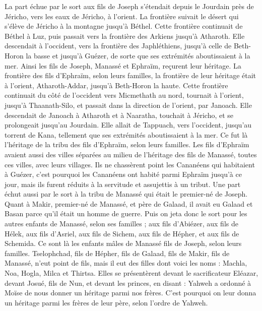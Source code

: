 \begin{multicols}{2}
\VerseOne{}La part échue par le sort aux fils de Joseph s’étendait depuis le Jourdain près de Jéricho, vers les eaux de Jéricho, à l’orient. La frontière suivait le désert qui s’élève de Jéricho à la montagne jusqu’à Béthel.
Cette frontière continuait de Béthel à Luz, puis passait vers la frontière des Arkiens jusqu’à Atharoth.
Elle descendait à l’occident, vers la frontière des Japhléthiens, jusqu’à celle de Beth-Horon la basse et jusqu’à Guézer, de sorte que ses extrémités aboutissaient à la mer.
Ainsi les fils de Joseph, Manassé et Ephraïm, reçurent leur héritage.
La frontière des fils d’Ephraïm, selon leurs familles, la frontière de leur héritage était à l’orient, Atharoth-Addar, jusqu’à Beth-Horon la haute.
Cette frontière continuait du côté de l’occident vers Micmethath au nord, tournait à l’orient, jusqu’à Thaanath-Silo, et passait dans la direction de l’orient, par Janoach.
Elle descendait de Janoach à Atharoth et à Naaratha, touchait à Jéricho, et se prolongeait jusqu’au Jourdain.
Elle allait de Tappuach, vers l’occident, jusqu’au torrent de Kana, tellement que ses extrémités aboutissaient à la mer. Ce fut là l’héritage de la tribu des fils d’Ephraïm, selon leurs familles.
Les fils d’Ephraïm avaient aussi des villes séparées au milieu de l’héritage des fils de Manassé, toutes ces villes, avec leurs villages.
Ils ne chassèrent point les Cananéens qui habitaient à Guézer, c’est pourquoi les Cananéens ont habité parmi Ephraïm jusqu’à ce jour, mais ils furent réduits à la servitude et assujettis à un tribut.
\VerseOne{}Une part échut aussi par le sort à la tribu de Manassé qui était le premier-né de Joseph. Quant à Makir, premier-né de Manassé, et père de Galaad, il avait eu Galaad et Basan parce qu’il était un homme de guerre.
Puis on jeta donc le sort pour les autres enfants de Manassé, selon ses familles ; aux fils d’Abiézer, aux fils de Hélek, aux fils d’Asriel, aux fils de Sichem, aux fils de Hépher, et aux fils de Schemida. Ce sont là les enfants mâles de Manassé fils de Joseph, selon leurs familles.
Tselophchad, fils de Hépher, fils de Galaad, fils de Makir, fils de Manassé, n’eut point de fils, mais il eut des filles dont voici les noms : Machla, Noa, Hogla, Milca et Thirtsa.
Elles se présentèrent devant le sacrificateur Eléazar, devant Josué, fils de Nun, et devant les princes, en disant : Yahweh a ordonné à Moïse de nous donner un héritage parmi nos frères. C’est pourquoi on leur donna un héritage parmi les frères de leur père, selon l’ordre de Yahweh.

\end{multicols}
